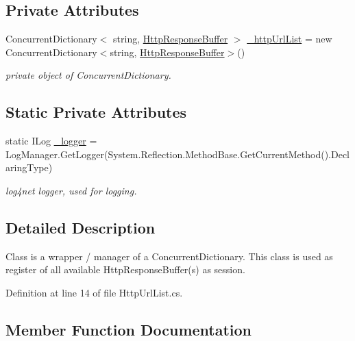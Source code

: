 \subsection*{Private Attributes}
\begin{DoxyCompactItemize}
\item 
Concurrent\+Dictionary$<$ string, \mbox{\hyperlink{class_concord_1_1_c3_http_module_1_1_http_response_buffer}{Http\+Response\+Buffer}} $>$ \mbox{\hyperlink{class_concord_1_1_c3_http_module_1_1_http_url_list_a28cb149b807e1ccecab2eb3291e07528}{\+\_\+http\+Url\+List}} = new Concurrent\+Dictionary$<$string, \mbox{\hyperlink{class_concord_1_1_c3_http_module_1_1_http_response_buffer}{Http\+Response\+Buffer}}$>$()
\begin{DoxyCompactList}\small\item\em private object of Concurrent\+Dictionary. \end{DoxyCompactList}\end{DoxyCompactItemize}
\subsection*{Static Private Attributes}
\begin{DoxyCompactItemize}
\item 
static I\+Log \mbox{\hyperlink{class_concord_1_1_c3_http_module_1_1_http_url_list_ae0a89d748d91a2c6bad3d66a78c11a3d}{\+\_\+logger}} = Log\+Manager.\+Get\+Logger(System.\+Reflection.\+Method\+Base.\+Get\+Current\+Method().Declaring\+Type)
\begin{DoxyCompactList}\small\item\em log4net logger, used for logging. \end{DoxyCompactList}\end{DoxyCompactItemize}


\subsection{Detailed Description}
Class is a wrapper / manager of a Concurrent\+Dictionary. This class is used as register of all available Http\+Response\+Buffer(s) as session. 



Definition at line 14 of file Http\+Url\+List.\+cs.



\subsection{Member Function Documentation}
\mbox{\label{class_concord_1_1_c3_http_module_1_1_http_url_list_acde20901c40b7add9cb2db32ab1c9953}} 
